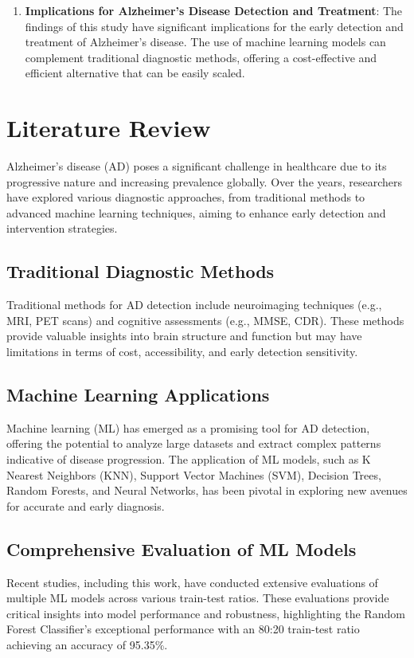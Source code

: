 \documentclass[a4paper,12pt]{report}
\begin{document}
\begin{enumerate}
    \item \textbf{Implications for Alzheimer's Disease Detection and Treatment}: The findings of this study have significant implications for the early detection and treatment of Alzheimer's disease. The use of machine learning models can complement traditional diagnostic methods, offering a cost-effective and efficient alternative that can be easily scaled.
\end{enumerate}

\chapter{Literature Review}

Alzheimer’s disease (AD) poses a significant challenge in healthcare due to its progressive nature and increasing prevalence globally. Over the years, researchers have explored various diagnostic approaches, from traditional methods to advanced machine learning techniques, aiming to enhance early detection and intervention strategies.

\section*{Traditional Diagnostic Methods}
Traditional methods for AD detection include neuroimaging techniques (e.g., MRI, PET scans) and cognitive assessments (e.g., MMSE, CDR). These methods provide valuable insights into brain structure and function but may have limitations in terms of cost, accessibility, and early detection sensitivity.

\section*{Machine Learning Applications}
Machine learning (ML) has emerged as a promising tool for AD detection, offering the potential to analyze large datasets and extract complex patterns indicative of disease progression. The application of ML models, such as K Nearest Neighbors (KNN), Support Vector Machines (SVM), Decision Trees, Random Forests, and Neural Networks, has been pivotal in exploring new avenues for accurate and early diagnosis.

\section*{Comprehensive Evaluation of ML Models}
Recent studies, including this work, have conducted extensive evaluations of multiple ML models across various train-test ratios. These evaluations provide critical insights into model performance and robustness, highlighting the Random Forest Classifier's exceptional performance with an 80:20 train-test ratio achieving an accuracy of 95.35\%.
\end{document}
